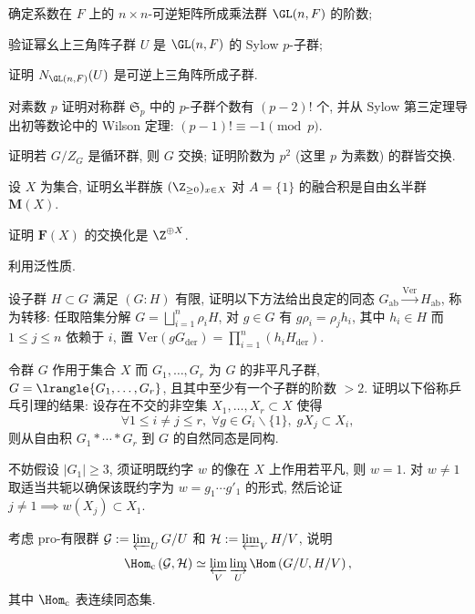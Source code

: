 \begin{Exercises}
		\begin{compactenum}[(i)]
			\item 确定系数在 $F$ 上的 $n \times n$-可逆矩阵所成乘法群 $\GL(n, F)$ 的阶数;
			\item 验证幂幺上三角阵子群 $U$ 是 $\GL(n,F)$ 的 Sylow $p$-子群;
			\item 证明 $N_{\GL(n,F)}(U)$ 是可逆上三角阵所成子群.
		\end{compactenum}
	\item 对素数 $p$ 证明对称群 $\mathfrak{S}_p$ 中的 $p$-子群个数有 $(p-2)!$ 个, 并从 Sylow 第三定理导出初等数论中的 Wilson 定理: $(p-1)! \equiv -1 \pmod p$.
	\item 证明若 $G/Z_G$ 是循环群, 则 $G$ 交换; 证明阶数为 $p^2$ (这里 $p$ 为素数) 的群皆交换.
	\item 设 $X$ 为集合, 证明幺半群族 $(\Z_{\geq 0})_{x \in X}$ 对 $A=\{1\}$ 的融合积是自由幺半群 $\mathbf{M}(X)$.
	\item 证明 $\mathbf{F}(X)$ 的交换化是 $\Z^{\oplus X}$. \begin{hint} 利用泛性质. \end{hint}
	\item 设子群 $H \subset G$ 满足 $(G:H)$ 有限, 证明以下方法给出良定的同态 $G_\text{ab} \xrightarrow{\text{Ver}} H_\text{ab}$, 称为转移: 任取陪集分解 $G = \bigsqcup_{i=1}^n \rho_i H$, 对 $g \in G$ 有 $g \rho_i = \rho_j h_i$, 其中 $h_i \in H$ 而 $1 \leq j \leq n$ 依赖于 $i$, 置 $\text{Ver}(g G_\text{der}) = \prod_{i=1}^n \left( h_i H_\text{der}\right)$.
	\item 令群 $G$ 作用于集合 $X$ 而 $G_1, \ldots, G_r$ 为 $G$ 的非平凡子群, $G=\lrangle{G_1, \ldots, G_r}$, 且其中至少有一个子群的阶数 $> 2$. 证明以下俗称乒乓引理的结果: 设存在不交的非空集 $X_1, \ldots, X_r \subset X$ 使得
		\[ \forall 1 \leq i \neq j \leq r, \; \forall g \in G_i \smallsetminus \{1\}, \; g X_j \subset X_i, \]
		则从自由积 $G_1 \ast \cdots \ast G_r$ 到 $G$ 的自然同态是同构. \begin{hint} 不妨假设 $|G_1| \geq 3$, 须证明既约字 $w$ 的像在 $X$ 上作用若平凡, 则 $w=1$. 对 $w \neq 1$ 取适当共轭以确保该既约字为 $w = g_1 \cdots g'_1$ 的形式, 然后论证 $j \neq 1 \implies w(X_j) \subset X_1$.\end{hint}
	\item 考虑 pro-有限群 $\mathcal{G} := \varprojlim_U G/U$ 和 $\mathcal{H} := \varprojlim_V H/V$, 说明
		\[ \Hom_{\mathrm{c}}\left( \mathcal{G}, \mathcal{H} \right) \simeq \varprojlim_V \varinjlim_U \Hom\left(G/U, H/V \right), \]
		其中 $\Hom_{\mathrm{c}}$ 表连续同态集.
\end{Exercises}